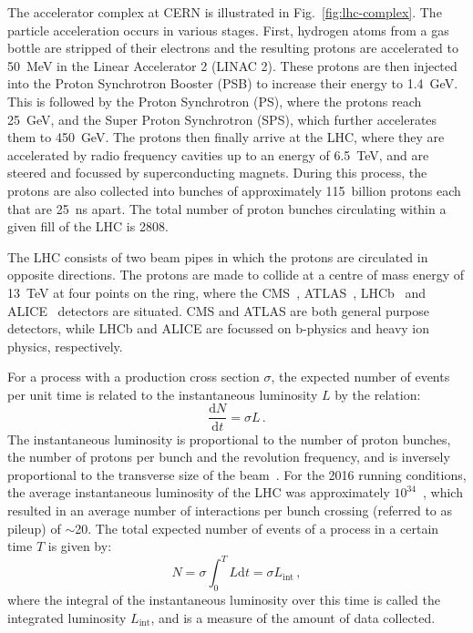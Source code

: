 The accelerator complex at CERN is illustrated in Fig.~\ref{fig:lhc-complex}. 
The particle acceleration occurs in various stages. First, hydrogen atoms from 
a gas bottle are stripped of their electrons and the resulting protons are 
accelerated to 50~MeV in the Linear Accelerator 2 (LINAC 2). These protons are 
then injected into the Proton Synchrotron Booster (PSB) to increase their 
energy to 1.4~GeV. This is followed by the Proton Synchrotron (PS), where the 
protons reach 25~GeV, and the Super Proton Synchrotron (SPS), which further 
accelerates them to 450~GeV. The protons then finally arrive at the LHC, where 
they are accelerated by radio frequency cavities up to an energy of 6.5~TeV, 
and are steered and focussed by superconducting magnets.
During this process, the protons are also collected into bunches of 
approximately 115~billion protons each that are 25~ns apart. The total number 
of proton bunches circulating within a given fill of the LHC is 2808.

The LHC consists of two beam pipes in which the protons are circulated in 
opposite directions. The protons are made to collide at a centre of mass energy 
of 13~TeV at four points on the ring, where the CMS~\cite{cms}, 
ATLAS~\cite{atlas}, LHCb~\cite{lhcb} and ALICE~\cite{alice} detectors are 
situated. CMS and ATLAS are both general purpose detectors, while LHCb and 
ALICE are focussed on b-physics and heavy ion physics, respectively.

For a process with a production cross section $\sigma$, the expected number of 
events per unit time is related to the instantaneous luminosity $L$ by the 
relation:
\begin{equation}
\frac{\mathrm d N}{\mathrm d t} = \sigma L \, .
\end{equation}
The instantaneous luminosity is proportional to the number of proton bunches, 
the number of protons per bunch and the revolution frequency, and is inversely 
proportional to the transverse size of the beam~\cite{pdg12}. 
For the 2016 running conditions, the average instantaneous luminosity of the 
LHC was approximately $10^{34}$~\lumiunits, which resulted in an average number 
of 
interactions per bunch crossing (referred to as pileup) of $\sim$20.
The total expected number of events of a process in a certain time $T$ is given 
by:
\begin{equation}
N = \sigma \int_{0}^{T} L \mathrm d t = \sigma L_\mathrm{int} \, ,
\end{equation}
where the integral of the instantaneous luminosity over this time is called the 
integrated luminosity $L_\mathrm{int}$, and is a measure of the amount of data 
collected.

